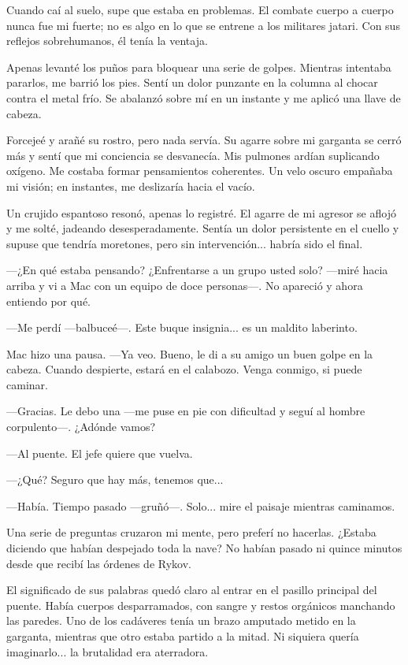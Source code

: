 Cuando caí al suelo, supe que estaba en problemas. El combate cuerpo a cuerpo nunca fue mi fuerte; no es algo en lo que se entrene a los militares jatari. Con sus reflejos sobrehumanos, él tenía la ventaja.

Apenas levanté los puños para bloquear una serie de golpes. Mientras intentaba pararlos, me barrió los pies. Sentí un dolor punzante en la columna al chocar contra el metal frío. Se abalanzó sobre mí en un instante y me aplicó una llave de cabeza.

Forcejeé y arañé su rostro, pero nada servía. Su agarre sobre mi garganta se cerró más y sentí que mi conciencia se desvanecía. Mis pulmones ardían suplicando oxígeno. Me costaba formar pensamientos coherentes. Un velo oscuro empañaba mi visión; en instantes, me deslizaría hacia el vacío.

Un crujido espantoso resonó, apenas lo registré. El agarre de mi agresor se aflojó y me solté, jadeando desesperadamente. Sentía un dolor persistente en el cuello y supuse que tendría moretones, pero sin intervención... habría sido el final.

 —¿En qué estaba pensando? ¿Enfrentarse a un grupo usted solo? —miré hacia arriba y vi a Mac con un equipo de doce personas—. No apareció y ahora entiendo por qué.

—Me perdí —balbuceé—. Este buque insignia... es un maldito laberinto.

Mac hizo una pausa. —Ya veo. Bueno, le di a su amigo un buen golpe en la cabeza. Cuando despierte, estará en el calabozo. Venga conmigo, si puede caminar.

—Gracias. Le debo una —me puse en pie con dificultad y seguí al hombre corpulento—. ¿Adónde vamos?

—Al puente. El jefe quiere que vuelva.

 —¿Qué? Seguro que hay más, tenemos que...

—Había. Tiempo pasado —gruñó—. Solo... mire el paisaje mientras caminamos.

Una serie de preguntas cruzaron mi mente, pero preferí no hacerlas. ¿Estaba diciendo que habían despejado toda la nave? No habían pasado ni quince minutos desde que recibí las órdenes de Rykov.

El significado de sus palabras quedó claro al entrar en el pasillo principal del puente. Había cuerpos desparramados, con sangre y restos orgánicos manchando las paredes. Uno de los cadáveres tenía un brazo amputado metido en la garganta, mientras que otro estaba partido a la mitad. Ni siquiera quería imaginarlo... la brutalidad era aterradora.

